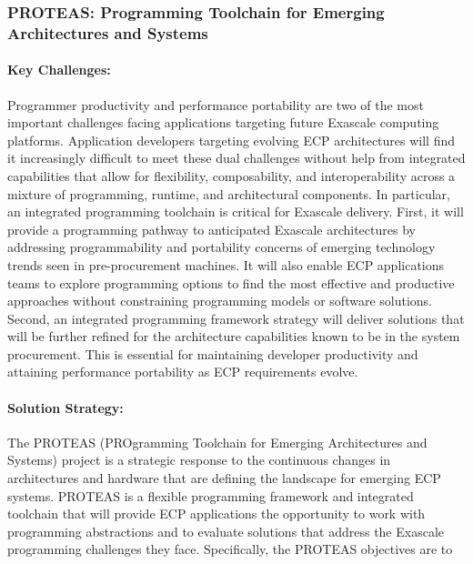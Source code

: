 \subsubsection{ PROTEAS: Programming Toolchain for Emerging Architectures and Systems} 


\paragraph{Key  Challenges:}
Programmer productivity and performance portability are two of the most important challenges facing applications targeting future Exascale computing platforms. Application developers targeting evolving ECP architectures will find it increasingly difficult to meet these dual challenges without help from integrated capabilities that allow for flexibility, composability, and interoperability across a mixture of programming, runtime, and architectural components. In particular, an integrated programming toolchain is critical for Exascale delivery. First, it will provide a programming pathway to anticipated Exascale architectures by addressing programmability and portability concerns of emerging technology trends seen in pre-procurement machines. It will also enable ECP applications teams to explore programming options to find the most effective and productive approaches without constraining programming models or software solutions. Second, an integrated programming framework strategy will deliver solutions that will be further refined for the architecture capabilities known to be in the system procurement. This is essential for maintaining developer productivity and attaining performance portability as ECP requirements evolve.


\paragraph{Solution Strategy:}
The PROTEAS (PROgramming Toolchain for Emerging Architectures and Systems) project is a strategic response to the continuous changes in architectures and hardware that are defining the landscape for emerging ECP systems. PROTEAS is a flexible programming framework and integrated toolchain that will provide ECP applications the opportunity to work with programming abstractions and to evaluate solutions that address the Exascale programming challenges they face. Specifically, the PROTEAS objectives are to

